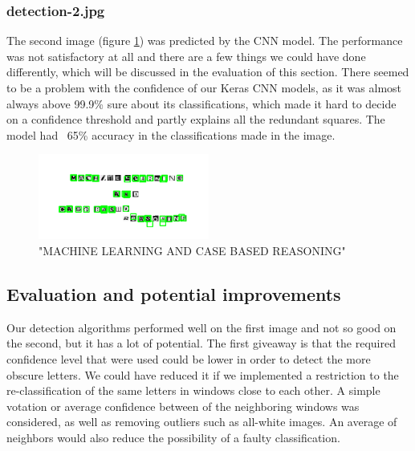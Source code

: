 \subsubsection{detection-2.jpg}

The second image (figure \ref{fig:svm_detect2}) was predicted by the CNN model. The performance was not satisfactory at all and there are a few things we could have done differently, which will be discussed in the evaluation of this section. There seemed to be a problem with the confidence of our Keras CNN models, as it was almost always above 99.9\% sure about its classifications, which made it hard to decide on a confidence threshold and partly explains all the redundant squares. The model had ~65\% accuracy in the classifications made in the image.


\begin{figure}[H]
    \centering
    \includegraphics[width=0.5\textwidth]{pictures/svm_pred2.png}
    \caption{"MACHINE LEARNING AND CASE BASED REASONING"}
    \label{fig:svm_detect2}
\end{figure}

\subsection{Evaluation and potential improvements}

Our detection algorithms performed well on the first image and not so good on the second, but it has a lot of potential. The first giveaway is that the required confidence level that were used could be lower in order to detect the more obscure letters. We could have reduced it if we implemented a restriction to the re-classification of the same letters in windows close to each other. A simple votation or average confidence between of the neighboring windows was considered, as well as removing outliers such as all-white images. An average of neighbors would also reduce the possibility of a faulty classification.

